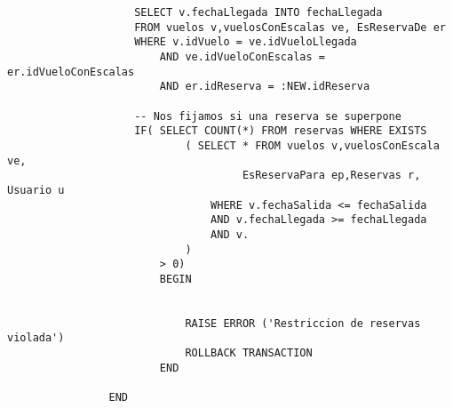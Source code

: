 \begin{itemize}
\begin{itemize}
\begin{lstlisting}
					SELECT v.fechaLlegada INTO fechaLlegada
					FROM vuelos v,vuelosConEscalas ve, EsReservaDe er
					WHERE v.idVuelo = ve.idVueloLlegada
						AND ve.idVueloConEscalas = er.idVueloConEscalas
						AND er.idReserva = :NEW.idReserva
					
					-- Nos fijamos si una reserva se superpone
					IF( SELECT COUNT(*) FROM reservas WHERE EXISTS
							( SELECT * FROM vuelos v,vuelosConEscala ve,
									 EsReservaPara ep,Reservas r, Usuario u
								WHERE v.fechaSalida <= fechaSalida
								AND v.fechaLlegada >= fechaLlegada
								AND v.
							)
						> 0)
						BEGIN
						

							RAISE ERROR ('Restriccion de reservas violada')
							ROLLBACK TRANSACTION
						END

				END
			\end{lstlisting}
	
			\end{itemize}
\end{itemize}

